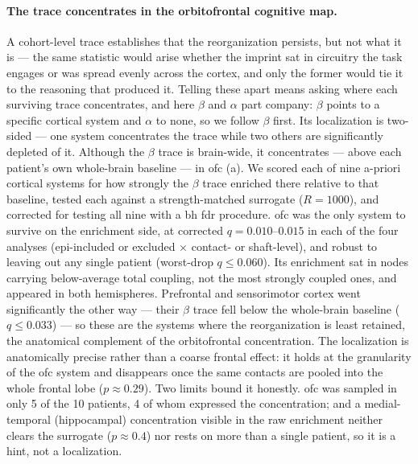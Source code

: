 \paragraph{The trace concentrates in the orbitofrontal cognitive map.}
A cohort-level trace establishes that the reorganization persists, but not what it is --- the same statistic would arise whether the imprint sat in circuitry the task engages or was spread evenly across the cortex, and only the former would tie it to the reasoning that produced it. Telling these apart means asking where each surviving trace concentrates, and here \(\beta\) and \(\alpha\) part company: \(\beta\) points to a specific cortical system and \(\alpha\) to none, so we follow \(\beta\) first. Its localization is two-sided --- one system concentrates the trace while two others are significantly depleted of it. Although the \(\beta\) trace is brain-wide, it concentrates --- above each patient's own whole-brain baseline --- in \gls{ofc} (a). We scored each of nine a-priori cortical systems for how strongly the \(\beta\) trace enriched there relative to that baseline, tested each against a strength-matched surrogate (\(R = 1000\)), and corrected for testing all nine with a \gls{bh} \gls{fdr} procedure. \gls{ofc} was the only system to survive on the enrichment side, at corrected \(q = 0.010\)--\(0.015\) in each of the four analyses (epi-included or excluded \(\times\) contact- or shaft-level), and robust to leaving out any single patient (worst-drop \(q \le 0.060\)). Its enrichment sat in nodes carrying below-average total coupling, not the most strongly coupled ones, and appeared in both hemispheres. Prefrontal and sensorimotor cortex went significantly the other way --- their \(\beta\) trace fell below the whole-brain baseline (\(q \le 0.033\)) --- so these are the systems where the reorganization is least retained, the anatomical complement of the orbitofrontal concentration. The localization is anatomically precise rather than a coarse frontal effect: it holds at the granularity of the \gls{ofc} system and disappears once the same contacts are pooled into the whole frontal lobe (\(p \approx 0.29\)). Two limits bound it honestly. \gls{ofc} was sampled in only 5 of the 10 patients, 4 of whom expressed the concentration; and a medial-temporal (hippocampal) concentration visible in the raw enrichment neither clears the surrogate (\(p \approx 0.4\)) nor rests on more than a single patient, so it is a hint, not a localization.

